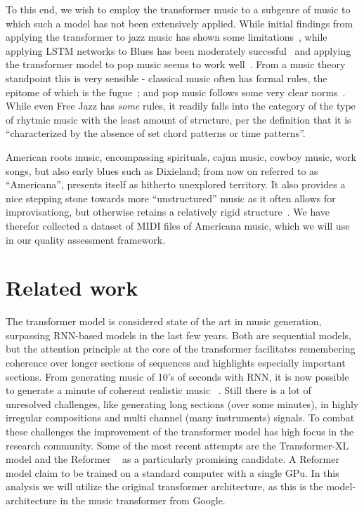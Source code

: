 \documentclass{IEEEtran}
\begin{document}
        To this end, we wish to employ the transformer music to a subgenre of music   
        to which such a model has not been extensively applied.
        While initial findings from applying the transformer to jazz music has shown 
        some limitations~\cite{wu2020jazz}, while applying LSTM networks to Blues has 
        been moderately succesful~\cite{eck2002bluesLSTM} and applying the transformer 
        model to pop music seems to work well~\cite{huang2020pop}.
        From a music theory standpoint this is very sensible - classical music often has 
        formal rules, the epitome of which is the fugue~\cite{giraud2015computational};
        and pop music follows some very clear norms~\cite{hennion1983production}. While 
        even Free Jazz has \emph{some} rules, it readily falls into the category of the 
        type of rhytmic music with the least amount of structure, per the definition
        that it is ``characterized by the absence of set chord patterns or
        time patterns''\cite{FreeJazz}.

        American roots music, encompassing spirituals, cajun music, cowboy music, work songs,
        but also early blues such as Dixieland; from now on referred to as ``Americana'', presents 
        itself as hitherto unexplored territory. It also provides a nice stepping stone
        towards more ``unstructured'' music as it often allows for improvisationg, but 
        otherwise retains a relatively rigid structure~\cite{libcong}.
        We have therefor collected a dataset of MIDI files of Americana music, which we
        will use in our quality assessment framework.

    \section{Related work}
       The transformer model is considered state of the art in music generation,
       surpassing RNN-based models in the last few years. Both are sequential models,
       but the attention principle at the core of the transformer facilitates
       remembering coherence over longer sections of sequences and highlights
       especially important sections. From generating music of 10's of seconds with RNN, it is now possible to generate a minute of coherent realistic music ~\cite{huang2018music}. Still there is a lot of unresolved challenges, like generating long sections (over some minutes), in highly irregular compositions
       and multi channel (many instruments) signals. To combat these challenges the
       improvement of the transformer model has high focus in the research community.
       Some of the most recent attempts are the Transformer-XL ~\cite{dai2019transformerxl} 
       model and the Reformer ~\cite{kitaev2020reformer} as a particularly promising candidate. A Reformer model claim to be trained on a standard computer with a single GPu. In this analysis we will utilize the original transformer architecture, as this is the model-architecture in the music transformer from Google.
\end{document}

